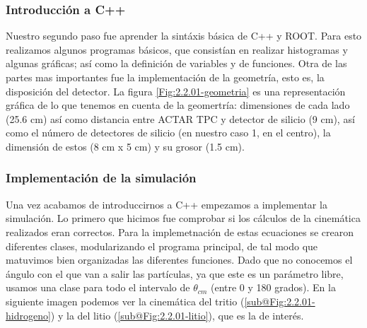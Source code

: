\documentclass[12pt,a4paper]{article}
\numberwithin{equation}{section}
\numberwithin{figure}{section}
\begin{document}
\subsubsection{Introducción a C++}

Nuestro segundo paso fue aprender la sintáxis básica de C++ y ROOT. Para esto realizamos algunos programas básicos, que consistían en realizar histogramas y algunas gráficas; así como la definición de variables y de funciones. Otra de las partes mas importantes fue la implementación de la geometría, esto es, la disposición del detector. La figura \ref{Fig:2.2.01-geometria} es una representación gráfica de lo que tenemos en cuenta de la geomertría: dimensiones de cada lado (25.6 cm) así como distancia entre ACTAR TPC y detector de silicio (9 cm), así como el número de detectores de silicio (en nuestro caso 1, en el centro), la dimensión de estos (8 cm x 5 cm) y su grosor (1.5 cm).

\subsubsection{Implementación de la simulación}

Una vez acabamos de introduccirnos a C++ empezamos a implementar la simulación. Lo primero que hicimos fue comprobar si los cálculos  de la cinemática realizados eran correctos. Para la implemetnación de estas ecuaciones se crearon diferentes clases, modularizando el programa principal, de tal modo que matuvimos bien organizadas las diferentes funciones. Dado que no conocemos el ángulo con el que van a salir las partículas, ya que este es un parámetro libre, usamos una clase para todo el intervalo de $\theta_{cm}$ (entre 0 y 180 grados). En la siguiente imagen podemos ver la cinemática del tritio (\ref{sub@Fig:2.2.01-hidrogeno}) y la del litio (\ref{sub@Fig:2.2.01-litio}), que es la de interés.   \\
\end{document}
